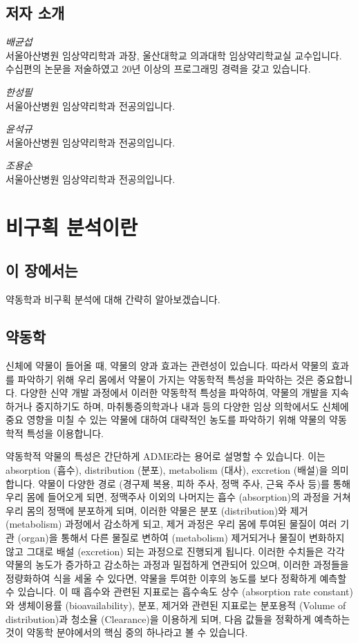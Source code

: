 \documentclass[12pt,]{krantz}
\theoremstyle{definition}
\theoremstyle{definition}
\theoremstyle{definition}
\theoremstyle{remark}
\begin{document}
\section*{저자 소개}\label{-}


\emph{배균섭}\\
서울아산병원 임상약리학과 과장, 울산대학교 의과대학 임상약리학교실
교수입니다. 수십편의 논문을 저술하였고 20년 이상의 프로그래밍 경력을
갖고 있습니다.

\emph{한성필}\\
서울아산병원 임상약리학과 전공의입니다.

\emph{윤석규}\\
서울아산병원 임상약리학과 전공의입니다.

\emph{조용순}\\
서울아산병원 임상약리학과 전공의입니다.

\mainmatter

\chapter{비구획 분석이란}\label{introduction}

\section{이 장에서는}\label{summary-introduction}

약동학과 비구획 분석에 대해 간략히 알아보겠습니다.

\section{약동학}\label{PK-introduction}

신체에 약물이 들어올 때, 약물의 양과 효과는 관련성이 있습니다. 따라서
약물의 효과를 파악하기 위해 우리 몸에서 약물이 가지는 약동학적 특성을
파악하는 것은 중요합니다. 다양한 신약 개발 과정에서 이러한 약동학적
특성을 파악하여, 약물의 개발을 지속하거나 중지하기도 하며,
마취통증의학과나 내과 등의 다양한 임상 의학에서도 신체에 중요 영향을
미칠 수 있는 약물에 대하여 대략적인 농도를 파악하기 위해 약물의 약동학적
특성을 이용합니다.

약동학적 약물의 특성은 간단하게 ADME라는 용어로 설명할 수 있습니다. 이는
absorption (흡수), distribution (분포), metabolism (대사), excretion
(배설)을 의미합니다. 약물이 다양한 경로 (경구제 복용, 피하 주사, 정맥
주사, 근육 주사 등)를 통해 우리 몸에 들어오게 되면, 정맥주사 이외의
나머지는 흡수 (absorption)의 과정을 거쳐 우리 몸의 정맥에 분포하게 되며,
이러한 약물은 분포 (distribution)와 제거 (metabolism) 과정에서 감소하게
되고, 제거 과정은 우리 몸에 투여된 물질이 여러 기관 (organ)을 통해서
다른 물질로 변하여 (metabolism) 제거되거나 물질이 변화하지 않고 그대로
배설 (excretion) 되는 과정으로 진행되게 됩니다. 이러한 수치들은 각각
약물의 농도가 증가하고 감소하는 과정과 밀접하게 연관되어 있으며, 이러한
과정들을 정량화하여 식을 세울 수 있다면, 약물을 투여한 이후의 농도를
보다 정확하게 예측할 수 있습니다. 이 때 흡수와 관련된 지표로는 흡수속도
상수 (absorption rate constant)와 생체이용률 (bioavailability), 분포,
제거와 관련된 지표로는 분포용적 (Volume of distribution)과 청소율
(Clearance)을 이용하게 되며, 다음 값들을 정확하게 예측하는 것이 약동학
분야에서의 핵심 중의 하나라고 볼 수 있습니다.
\end{document}
